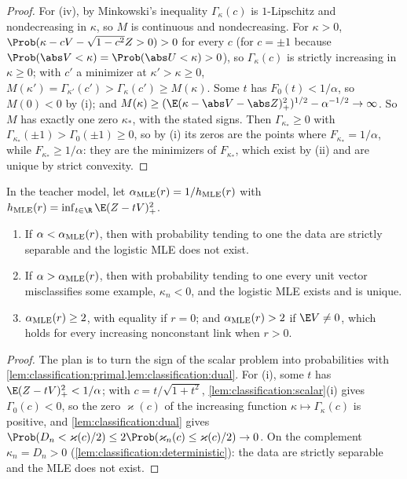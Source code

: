 \begin{refsection}
\begin{proof}
For (iv), by Minkowski's inequality $\Gamma_\kappa(c)$ is $1$-Lipschitz and nondecreasing in $\kappa$, so $M$ is continuous and nondecreasing. For $\kappa>0$, $\Prob(\kappa-cV-\sqrt{1-c^2}Z>0)>0$ for every $c$ (for $c=\pm1$ because $\Prob(\abs V<\kappa)=\Prob(\abs U<\kappa)>0$), so $\Gamma_\kappa(c)$ is strictly increasing in $\kappa\ge0$; with $c'$ a minimizer at $\kappa'>\kappa\ge0$, $M(\kappa')=\Gamma_{\kappa'}(c')>\Gamma_\kappa(c')\ge M(\kappa)$. Some $t$ has $F_0(t)<1/\alpha$, so $M(0)<0$ by (i); and $M(\kappa)\ge(\E(\kappa-\abs V-\abs Z)_+^2)^{1/2}-\alpha^{-1/2}\to\infty$. So $M$ has exactly one zero $\kappa_*$, with the stated signs. Then $\Gamma_{\kappa_*}\ge0$ with $\Gamma_{\kappa_*}(\pm1)>\Gamma_0(\pm1)\ge0$, so by (i) its zeros are the points where $F_{\kappa_*}=1/\alpha$, while $F_{\kappa_*}\ge1/\alpha$: they are the minimizers of $F_{\kappa_*}$, which exist by (ii) and are unique by strict convexity.
\end{proof}

\begin{theorem}\label{thm:classification:mle}
In the teacher model, let $\alpha_{\mathrm{MLE}}(r)=1/h_{\mathrm{MLE}}(r)$ with $\classificationh(r)=\inf_{t\in\R}\E(Z-tV)_+^2$.
\begin{enumerate}
\item If $\alpha<\alpha_{\mathrm{MLE}}(r)$, then with probability tending to one the data are strictly separable and the logistic MLE does not exist.
\item If $\alpha>\alpha_{\mathrm{MLE}}(r)$, then with probability tending to one every unit vector misclassifies some example, $\kappa_n<0$, and the logistic MLE exists and is unique.
\item $\alpha_{\mathrm{MLE}}(r)\ge2$, with equality if $r=0$; and $\alpha_{\mathrm{MLE}}(r)>2$ if $\E V\ne0$, which holds for every increasing nonconstant link when $r>0$.
\end{enumerate}
\end{theorem}

\begin{proof}
The plan is to turn the sign of the scalar problem into probabilities with \cref{lem:classification:primal,lem:classification:dual}. For (i), some $t$ has $\E(Z-tV)_+^2<1/\alpha$; with $c=t/\sqrt{1+t^2}$, \cref{lem:classification:scalar}(i) gives $\Gamma_0(c)<0$, so the zero $\varkappa(c)$ of the increasing function $\kappa\mapsto\Gamma_\kappa(c)$ is positive, and \cref{lem:classification:dual} gives $\Prob(D_n<\varkappa(c)/2)\le2\Prob(\varkappa_n(c)\le\varkappa(c)/2)\to0$. On the complement $\kappa_n=D_n>0$ (\cref{lem:classification:deterministic}): the data are strictly separable and the MLE does not exist.


\end{proof}
\end{refsection}
